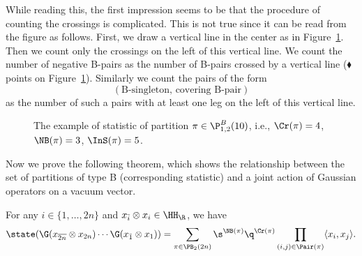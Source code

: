 \begin{Remark} \label{jakliczyc}
While reading this, the first impression seems to be that the procedure of counting the crossings is complicated. This is not true since it can be read from the figure as follows. First, we draw a vertical line in the center as in Figure~\ref{fig:examplejakliczyccrosingi}.
Then we count only the crossings on the left of this vertical line.
We count the number of
negative B-pairs as the number of B-pairs crossed by a vertical line ($\scriptstyle{\blacklozenge}$ points on Figure~\ref{fig:examplejakliczyccrosingi}).
Similarly we count the pairs of the form
\[
(\text{B-singleton, covering B-pair})
\]
as the number of such a pairs with at least one leg on the left of this vertical line.

\begin{figure}[htp]
\centering
{}
\caption{The example of statistic of partition $\pi \in \P_{1,2}^{B}(10)$, i.e., $\Cr(\pi)=4$, $\NB(\pi)=3$, $\InS(\pi)=5$.}
\label{fig:examplejakliczyccrosingi}
\end{figure}
\end{Remark}

Now we prove the following theorem, which shows the relationship between the set of partitions of type B
(corresponding statistic) and a joint action of Gaussian operators on a vacuum vector.

\begin{Theorem}\label{lem101}
For any $i\in\{1,\ldots,2n\}$ and $x_{\bar i}\otimes x_i \in \HH_\R$, we have
\begin{equation}\label{formula101}
	\state(\G(x_{\overline{ 2n}}\otimes x_{ 2n})\cdots \G(x_{\bar 1}\otimes x_{ 1}))= \sum_{\pi\in\PB_{2}(2n)} \s^{\NB(\pi)}\q^{\Cr(\pi)} \prod_{\substack{(i,j) \in \Pair(\pi)} }\langle x_i, x_j\rangle.
\end{equation}
\end{Theorem}


